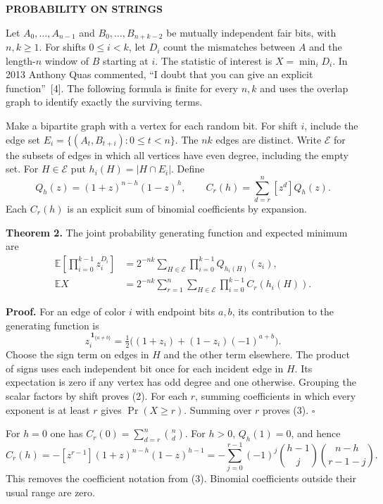 \documentclass[12pt,letterpaper]{article}
\newcommand{\sect}[2]{{\small\sffamily\bfseries\color{teal}#1}\par
\vspace{1pt}{\Large\bfseries\color{dark}#2}\par}
\newcommand{\strong}[1]{\textbf{\color{dark}#1}\enspace}
\newcommand{\E}{\mathbb E}
\newcommand{\eop}{\hfill$\square$}
\begin{document}
\newpage
\sect{PROBABILITY ON STRINGS}{2. The best overlapping Hamming match}

Let $A_0,\ldots,A_{n-1}$ and $B_0,\ldots,B_{n+k-2}$ be mutually independent fair bits, with $n,k\ge1$. For shifts $0\le i<k$, let $D_i$ count the mismatches between $A$ and the length-$n$ window of $B$ starting at $i$. The statistic of interest is $X=\min_i D_i$. In 2013 Anthony Quas commented, \textquotedblleft I doubt that you can give an explicit function\textquotedblright~[4]. The following formula is finite for every $n,k$ and uses the overlap graph to identify exactly the surviving terms.

Make a bipartite graph with a vertex for each random bit. For shift $i$, include the edge set $E_i=\{(A_t,B_{t+i}):0\le t<n\}$. The $nk$ edges are distinct. Write $\mathcal E$ for the subsets of edges in which all vertices have even degree, including the empty set. For $H\in\mathcal E$ put $h_i(H)=|H\cap E_i|$. Define
\[
 Q_h(z)=(1+z)^{n-h}(1-z)^h,\qquad
 C_r(h)=\sum_{d=r}^{n}[z^d]Q_h(z).
\]
Each $C_r(h)$ is an explicit sum of binomial coefficients by expansion.

\strong{Theorem 2.} The joint probability generating function and expected minimum are
\begin{align}
 \E\!\left[\prod_{i=0}^{k-1}z_i^{D_i}\right]
   &=2^{-nk}\sum_{H\in\mathcal E}\prod_{i=0}^{k-1}Q_{h_i(H)}(z_i), \tag{2}\\
 \E X
   &=2^{-nk}\sum_{r=1}^{n}\sum_{H\in\mathcal E}
                    \prod_{i=0}^{k-1}C_r(h_i(H)). \tag{3}
\end{align}

\strong{Proof.} For an edge of color $i$ with endpoint bits $a,b$, its contribution to the generating function is
\[
 z_i^{\,\mathbf 1_{\{a\ne b\}}}
    =\tfrac12\bigl((1+z_i)+(1-z_i)(-1)^{a+b}\bigr).
\]
Choose the sign term on edges in $H$ and the other term elsewhere. The product of signs uses each independent bit once for each incident edge in $H$. Its expectation is zero if any vertex has odd degree and one otherwise. Grouping the scalar factors by shift proves (2). For each $r$, summing coefficients in which every exponent is at least $r$ gives $\Pr(X\ge r)$. Summing over $r$ proves (3). \eop

For $h=0$ one has $C_r(0)=\sum_{d=r}^n\binom nd$. For $h>0$, $Q_h(1)=0$, and hence
\[
 C_r(h)=-[z^{r-1}](1+z)^{n-h}(1-z)^{h-1}
       =-\sum_{j=0}^{r-1}(-1)^j
          {h-1\choose j}{n-h\choose r-1-j}.
\]
This removes the coefficient notation from (3). Binomial coefficients outside their usual range are zero.
\end{document}
